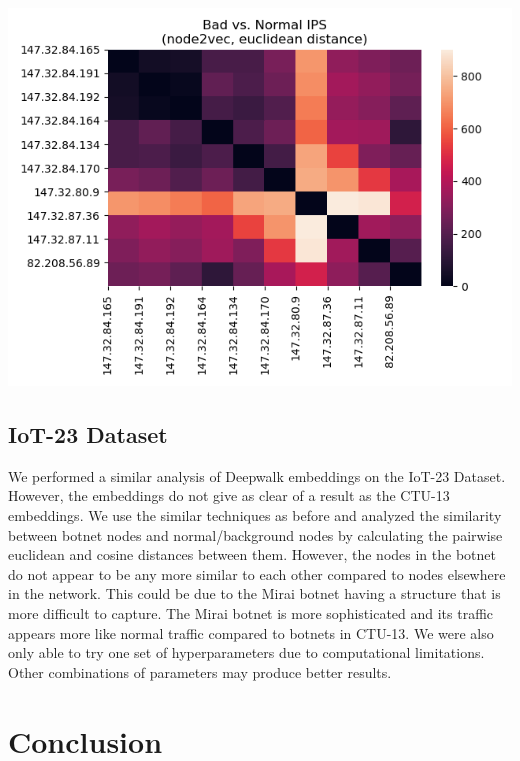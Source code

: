 \documentclass[10pt]{article}
\begin{document}
\begin{multicols}{2}
\includegraphics[scale=.5]{2b}


\subsection{IoT-23 Dataset}

We performed a similar analysis of Deepwalk embeddings on the IoT-23 Dataset. However, the embeddings do not give as clear of a result as the CTU-13 embeddings. We use the similar techniques as before and analyzed the similarity between botnet nodes and normal/background nodes by calculating the pairwise euclidean and cosine distances between them. However, the nodes in the botnet do not appear to be any more similar to each other compared to nodes elsewhere in the network. This could be due to the Mirai botnet having a structure that is more difficult to capture. The Mirai botnet is more sophisticated and its traffic appears more like normal traffic compared to botnets in CTU-13. We were also only able to try one set of hyperparameters due to computational limitations. Other combinations of parameters may produce better results. 

\section{Conclusion}


\end{multicols}
\end{document}

